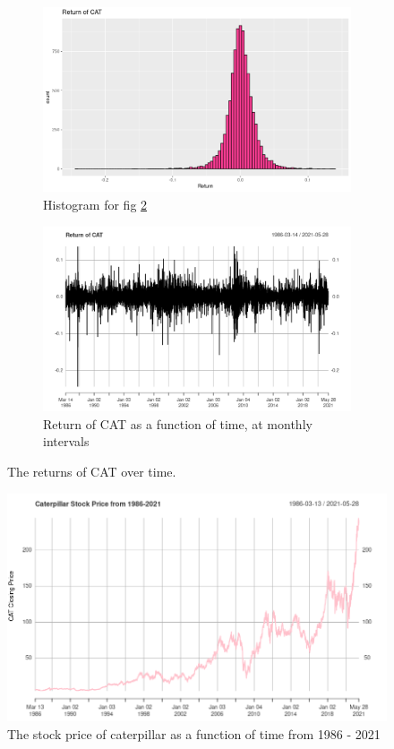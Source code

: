 \documentclass{article}
\begin{document}
\begin{figure}
	\centering
	\begin{subfigure}{\linewidth}
		\includegraphics[width=\linewidth]{return_of_cat_histo}
		\caption{Histogram for fig \ref{fig:returnCat}}
		\label{fig:returnHisto}
	\end{subfigure}
	\centering
	\begin{subfigure}{\linewidth}
		\includegraphics[width=\linewidth]{return_of_cat}
		\caption{Return of CAT as a function of time, at monthly intervals}
		\label{fig:returnCat}
	\end{subfigure}
	\caption{The returns of CAT over time.}
	\label{fig:return}
\end{figure}

\begin{figure}[h]
	\includegraphics[width=\linewidth]{caterpillar_stock_price}
	\caption{The stock price of caterpillar as a function of time from 1986 - 2021}
	\label{fig:stockPrices}
\end{figure}
\end{document}
